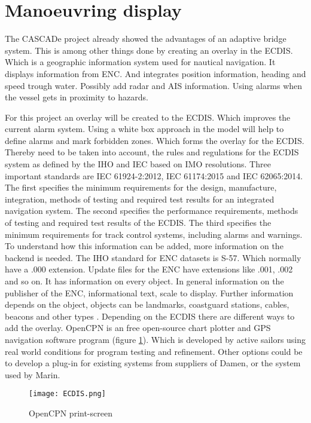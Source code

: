 \section{Manoeuvring display}
The CASCADe project already showed the advantages of an adaptive bridge system. This is among other things done by creating an overlay in the \ac{ECDIS}. Which is a geographic information system used for nautical navigation. It displays information from \ac{ENC}. And integrates position information, heading and speed trough water. Possibly add radar and \ac{AIS} information. Using alarms when the vessel gets in proximity to hazards. 

For this project an overlay will be created to the \ac{ECDIS}. Which improves the current alarm system. Using a white box approach in the model will help to define alarms and mark forbidden zones. Which forms the overlay for the \ac{ECDIS}.
Thereby need to be taken into account, the rules and regulations for the \ac{ECDIS} system as defined by the \ac{IHO} and \ac{IEC} based on \ac{IMO} resolutions. Three  important standards are IEC 61924-2:2012, IEC 61174:2015 and IEC 62065:2014.
The first specifies the minimum requirements for the design, manufacture, integration, methods of testing and required test results for an integrated navigation system.
The second specifies the performance requirements, methods of testing and required test results of the \ac{ECDIS}.
The third specifies the minimum requirements for track control systems, including alarms and warnings.
To understand how this information can be added, more information on the backend is needed. The \ac{IHO} standard for \ac{ENC} datasets is S-57. Which normally have a .000 extension. Update files for the \ac{ENC} have extensions like .001, .002 and so on. It has information on every object. In general information on the publisher of the \ac{ENC}, informational text, scale to display. Further information depends on the object, objects can be landmarks, coastguard stations, cables, beacons and other types \cite{IHO2017}. 
Depending on the \ac{ECDIS} there are different ways to add the overlay. OpenCPN is an free open-source chart plotter and GPS navigation software program (figure \ref{fig:ECDIS}). Which is developed by active sailors using real world conditions for program testing and refinement.
Other options could be to develop a plug-in for existing systems from suppliers of Damen, or the system used by Marin.

\begin{figure}[H]
	\centering
	\texttt{[image: ECDIS.png]}
	\caption{OpenCPN print-screen}
	\label{fig:ECDIS}
\end{figure}



